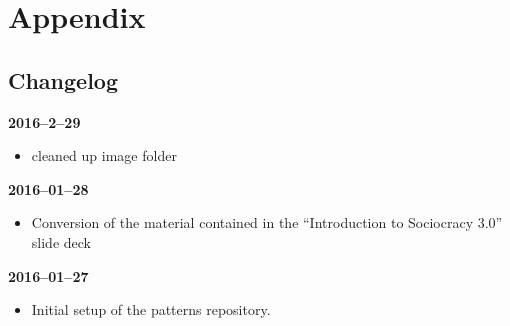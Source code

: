 \part{Appendix}
\label{appendix}

\chapter{Changelog}
\label{changelog}

\textbf{2016--2--29}

\begin{itemize}
\item cleaned up image folder

\end{itemize}

\textbf{2016--01--28}

\begin{itemize}
\item Conversion of the material contained in the ``Introduction to Sociocracy 3.0'' slide deck

\end{itemize}

\textbf{2016--01--27}

\begin{itemize}
\item Initial setup of the patterns repository.

\end{itemize}
